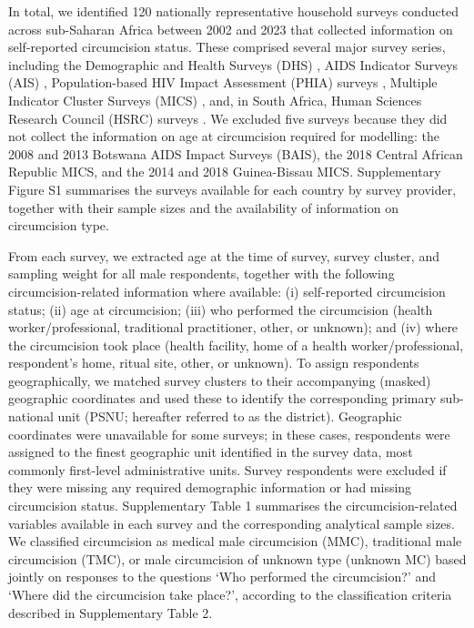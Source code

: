 \documentclass{article}
\begin{document}

In total, we identified 120 nationally representative household surveys conducted across sub-Saharan Africa between 2002 and 2023 that collected information on self-reported circumcision status. These comprised several major survey series, including the Demographic and Health Surveys (DHS) \cite{dhs}, AIDS Indicator Surveys (AIS) \cite{ais}, Population-based HIV Impact Assessment (PHIA) surveys \cite{phia}, Multiple Indicator Cluster Surveys (MICS) \cite{mics}, and, in South Africa, Human Sciences Research Council (HSRC) surveys \cite{hsrc}. We excluded five surveys because they did not collect the information on age at circumcision required for modelling: the 2008 and 2013 Botswana AIDS Impact Surveys (BAIS), the 2018 Central African Republic MICS, and the 2014 and 2018 Guinea-Bissau MICS. Supplementary Figure S1 summarises the surveys available for each country by survey provider, together with their sample sizes and the availability of information on circumcision type.

From each survey, we extracted age at the time of survey, survey cluster, and sampling weight for all male respondents, together with the following circumcision-related information where available: (i) self-reported circumcision status; (ii) age at circumcision; (iii) who performed the circumcision (health worker/professional, traditional practitioner, other, or unknown); and (iv) where the circumcision took place (health facility, home of a health worker/professional, respondent's home, ritual site, other, or unknown). To assign respondents geographically, we matched survey clusters to their accompanying (masked) geographic coordinates and used these to identify the corresponding primary sub-national unit (PSNU; hereafter referred to as the district). Geographic coordinates were unavailable for some surveys; in these cases, respondents were assigned to the finest geographic unit identified in the survey data, most commonly first-level administrative units. Survey respondents were excluded if they were missing any required demographic information or had missing circumcision status. Supplementary Table 1 summarises the circumcision-related variables available in each survey and the corresponding analytical sample sizes. We classified circumcision as medical male circumcision (MMC), traditional male circumcision (TMC), or male circumcision of unknown type (unknown MC) based jointly on responses to the questions ‘Who performed the circumcision?’ and ‘Where did the circumcision take place?’, according to the classification criteria described in Supplementary Table 2.
\end{document}
